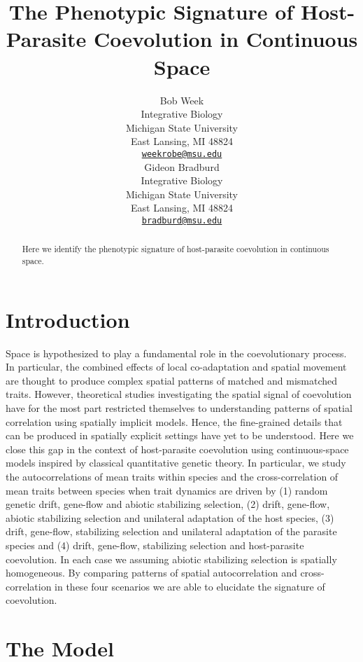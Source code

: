 \documentclass{article}
\title{The Phenotypic Signature of Host-Parasite Coevolution in Continuous
Space}
\author{
    Bob Week
   \\
    Integrative Biology \\
    Michigan State University \\
  East Lansing, MI 48824 \\
  \texttt{\href{mailto:weekrobe@msu.edu}{\nolinkurl{weekrobe@msu.edu}}} \\
   \And
    Gideon Bradburd
   \\
    Integrative Biology \\
    Michigan State University \\
  East Lansing, MI 48824 \\
  \texttt{\href{mailto:bradburd@msu.edu}{\nolinkurl{bradburd@msu.edu}}} \\
  }
\begin{document}
\maketitle

\def\tightlist{}


\begin{abstract}
Here we identify the phenotypic signature of host-parasite coevolution
in continuous space.
\end{abstract}


\hypertarget{introduction}{%
\section{Introduction}\label{introduction}}

Space is hypothesized to play a fundamental role in the coevolutionary
process. In particular, the combined effects of local co-adaptation and
spatial movement are thought to produce complex spatial patterns of
matched and mismatched traits. However, theoretical studies
investigating the spatial signal of coevolution have for the most part
restricted themselves to understanding patterns of spatial correlation
using spatially implicit models. Hence, the fine-grained details that
can be produced in spatially explicit settings have yet to be
understood. Here we close this gap in the context of host-parasite
coevolution using continuous-space models inspired by classical
quantitative genetic theory. In particular, we study the
autocorrelations of mean traits within species and the cross-correlation
of mean traits between species when trait dynamics are driven by (1)
random genetic drift, gene-flow and abiotic stabilizing selection, (2)
drift, gene-flow, abiotic stabilizing selection and unilateral
adaptation of the host species, (3) drift, gene-flow, stabilizing
selection and unilateral adaptation of the parasite species and (4)
drift, gene-flow, stabilizing selection and host-parasite coevolution.
In each case we assuming abiotic stabilizing selection is spatially
homogeneous. By comparing patterns of spatial autocorrelation and
cross-correlation in these four scenarios we are able to elucidate the
signature of coevolution.

\hypertarget{the-model}{%
\section{The Model}\label{the-model}}
\end{document}
